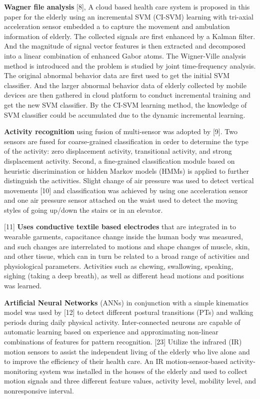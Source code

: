 \documentclass[a4paper, parskip=full]{scrartcl}
\begin{document}
\textbf{Wagner file analysis} [8], A cloud based health care system is proposed in this paper for the elderly using an incremental SVM (CI-SVM) learning with tri-axial acceleration sensor embedded a to capture the movement and ambulation information of elderly. The collected signals are first enhanced by a Kalman filter. And the magnitude of signal vector features is then extracted and decomposed into a linear combination of enhanced Gabor atoms. The Wigner-Ville analysis method is introduced and the problem is studied by joint time-frequency analysis. The original abnormal behavior data are first used to get the initial SVM classifier. And the larger abnormal behavior data of elderly collected by mobile devices are then gathered in cloud platform to conduct incremental training and get the new SVM classifier. By the CI-SVM learning method, the knowledge of SVM classifier could be accumulated due to the dynamic incremental learning. 


\textbf{Activity recognition} using fusion of multi-sensor was adopted by [9].  Two sensors are fused for coarse-grained classification in order to determine the type of the activity: zero displacement activity, transitional activity, and strong displacement activity. Second, a fine-grained classification module based on heuristic discrimination or hidden Markov models (HMMs) is applied to further distinguish the activities. Slight change of air pressure was used to detect vertical movements [10] and classification was achieved by using one acceleration sensor and one air pressure sensor attached on the waist used to detect the moving styles of going up/down the stairs or in an elevator. 

[11] \textbf{Uses conductive textile based electrodes} that are integrated in to wearable garments, capacitance change inside the human body was measured, and such changes are interrelated to motions and shape changes of muscle, skin, and other tissue, which can in turn be related to a broad range of activities and physiological parameters. Activities such as chewing, swallowing, speaking, sighing (taking a deep breath), as well as different head motions and positions was learned.

\textbf{Artificial Neural Networks} (ANNs) in conjunction with a simple kinematics model was used by [12] to detect different postural transitions (PTs) and walking periods during daily physical activity.  Inter-connected neurons are capable of automatic learning based on experience and approximating non-linear combinations of features for pattern recognition. [23] Utilize the infrared (IR) motion sensors to assist the independent living of the elderly who live alone and to improve the efficiency of their health care. An IR motion-sensor-based activity-monitoring system was installed in the houses of the elderly and used to collect motion signals and three different feature values, activity level, mobility level, and nonresponsive interval.
\end{document}
